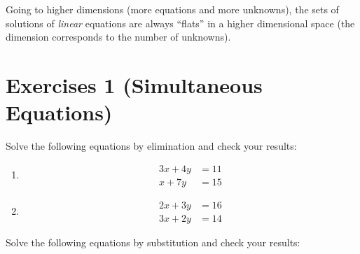 \documentclass[
  english,
  12pt,
  oneside]{book}
\theoremstyle{definition}
\theoremstyle{definition}
\theoremstyle{definition}
\theoremstyle{definition}
\theoremstyle{remark}
\begin{document}
Going to higher dimensions (more equations and more unknowns), the sets of solutions of \emph{linear} equations are always ``flats'' in a higher dimensional space (the dimension corresponds to the number of unknowns).

\chapter*{Exercises 1 (Simultaneous Equations)}\label{exercises-1-simultaneous-equations}

Solve the following equations by elimination and check your results:

\begin{enumerate}
\def\labelenumi{\arabic{enumi}.}
\item
  \begin{align*}
  3x+4y &= 11\\
  x+7y  &= 15
  \end{align*}
\item
  \begin{align*}
  2x+3y &= 16\\
  3x+2y &= 14
  \end{align*}
\end{enumerate}

Solve the following equations by substitution and check your results:
\end{document}
